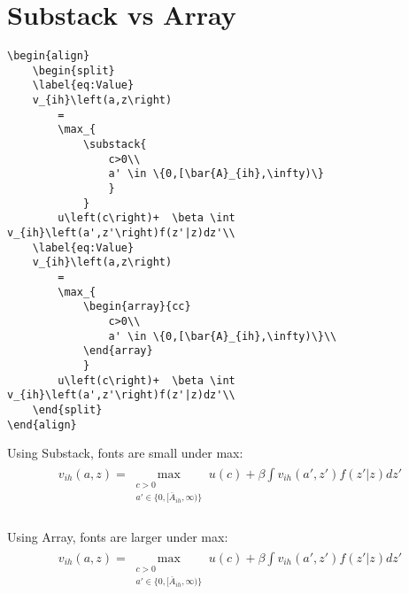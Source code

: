\documentclass[12pt,english]{article}
\begin{document}
\section{Substack vs Array}
\begin{verbatim}
\begin{align}
    \begin{split}
    \label{eq:Value}
    v_{ih}\left(a,z\right)
        =
        \max_{
            \substack{
                c>0\\
                a' \in \{0,[\bar{A}_{ih},\infty)\}
                }
            }
        u\left(c\right)+  \beta \int v_{ih}\left(a',z'\right)f(z'|z)dz'\\
    \label{eq:Value}
    v_{ih}\left(a,z\right)
        =
        \max_{
            \begin{array}{cc}
                c>0\\
                a' \in \{0,[\bar{A}_{ih},\infty)\}\\
            \end{array}
            }
        u\left(c\right)+  \beta \int v_{ih}\left(a',z'\right)f(z'|z)dz'\\
    \end{split}
\end{align}
\end{verbatim}

Using Substack, fonts are small under max:
\begin{align}
    \begin{split}
        \label{eq:Value}
        v_{ih}\left(a,z\right)
        =
        \max_{
            \substack{
                c>0\\
                a' \in \{0,[\bar{A}_{ih},\infty)\}
                }
            }
        u\left(c\right)+  \beta \int v_{ih}\left(a',z'\right)f(z'|z)dz'\\
    \end{split}
\end{align}

Using Array, fonts are larger under max:
\begin{align}
    \begin{split}
        \label{eq:Value}
        v_{ih}\left(a,z\right)
        =
        \max_{
            \begin{array}{cc}
                c>0\\
                a' \in \{0,[\bar{A}_{ih},\infty)\}\\
            \end{array}
            }
        u\left(c\right)+  \beta \int v_{ih}\left(a',z'\right)f(z'|z)dz'\\
    \end{split}
\end{align}
\end{document}

